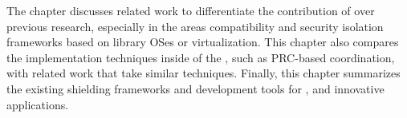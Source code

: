 The chapter discusses related work to differentiate the contribution of \graphene{}
over previous research,
especially in the areas compatibility and security isolation frameworks
based on library OSes or virtualization.
This chapter also compares the implementation techniques inside of the \libos{},
such as PRC-based coordination,
with related work that take similar techniques.
Finally, this chapter summarizes
the existing shielding frameworks and development tools for \sgx{},
and innovative \sgx{} applications.

